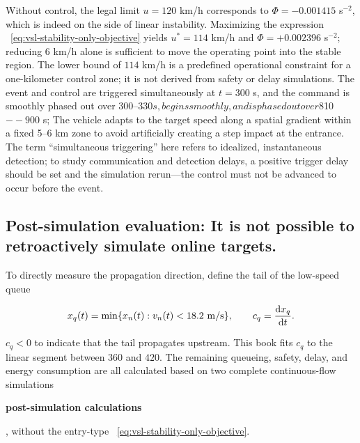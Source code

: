 \documentclass[11pt,a4paper,openany]{book}
\numberwithin{equation}{chapter}
\numberwithin{figure}{chapter}
\numberwithin{table}{chapter}
\begin{document}
Without control, the legal limit $u=120$ km/h corresponds to $\Phi=-0.001415$ s$^{-2}$, which is indeed on the side of linear instability. Maximizing the expression ~\eqref{eq:vsl-stability-only-objective} yields $u^*=114$ km/h and $\Phi=+0.002396$ s$^{-2}$; reducing $6$ km/h alone is sufficient to move the operating point into the stable region. The lower bound of $114$ km/h is a predefined operational constraint for a one-kilometer control zone; it is not derived from safety or delay simulations. The event and control are triggered simultaneously at $t=300$ s, and the command is smoothly phased out over $300$--330$ s, begins smoothly, and is phased out over $810$--900$ s; The vehicle adapts to the target speed along a spatial gradient within a fixed 5–6 km zone to avoid artificially creating a step impact at the entrance. The term “simultaneous triggering” here refers to idealized, instantaneous detection; to study communication and detection delays, a positive trigger delay should be set and the simulation rerun—the control must not be advanced to occur before the event.










\subsection{Post-simulation evaluation: It is not possible to retroactively simulate online targets.}





To directly measure the propagation direction, define the tail of the low-speed queue

\begin{equation}
x_q(t)=\min\{x_n(t):v_n(t)<18.2~{\rm m/s}\},
\qquad c_q=\frac{{\rm d}x_q}{{\rm d}t}.
\label{eq:vsl-queue-tail-speed}
\end{equation}

$c_q<0$ to indicate that the tail propagates upstream. This book fits $c_q$ to the linear segment between $360$ and $420$. The remaining queueing, safety, delay, and energy consumption are all calculated based on two complete continuous-flow simulations




\textbf{post-simulation calculations}




, without the entry-type ~\eqref{eq:vsl-stability-only-objective}.
\end{document}
